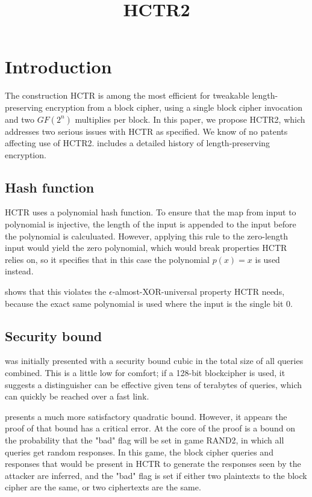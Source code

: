 \documentclass[letterpaper,11pt]{article}
\title{HCTR2}
\begin{document}
\maketitle

\begin{abstract}
\end{abstract}

\section{Introduction}
The construction HCTR\cite{hctr} is among the most efficient for 
tweakable length-preserving encryption from a block cipher, using
a single block cipher invocation and two \(GF(2^n)\) multiplies
per block. In this paper, we propose HCTR2, which addresses
two serious issues with HCTR as specified. We know of no
patents affecting use of HCTR2. \cite{adiantum} includes a detailed history of length-preserving encryption.

\subsection{Hash function}
HCTR uses a polynomial hash function. To ensure that the map from 
input to polynomial is injective, the length of the input is appended
to the input before the polynomial is calculuated. However, applying
this rule to the zero-length input would yield the zero polynomial,
which would break properties HCTR relies on, so it specifies that
in this case the polynomial \(p(x) = x\) is used instead.

\cite{kumarhctr} shows that this violates the 
\(\epsilon\)-almost-XOR-universal\cite{eadu} property HCTR needs, because
the exact same polynomial is used where the input is the single bit 0.

\subsection{Security bound}
\cite{hctr} was initially presented with a security bound cubic
in the total size of all queries combined.  This is a little low
for comfort; if a 128-bit blockcipher is used, it suggests a
distinguisher can be effective given tens of terabytes of queries,
which can quickly be reached over a fast link. 

\cite{hctrquad} presents a much more satisfactory quadratic bound.
However, it appears the proof of that bound has a critical error.
At the core of the proof is a bound on the probability that
the "bad" flag will be set in game RAND2, in which all queries
get random responses. In this game, the block cipher queries
and responses that would be present in HCTR to generate the
responses seen by the attacker are inferred, and the "bad"
flag is set if either two plaintexts to the block cipher
are the same, or two ciphertexts are the same.
\end{document}
